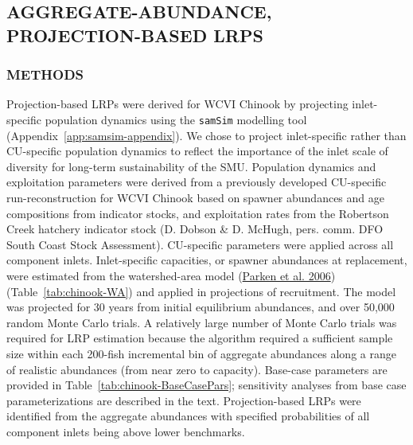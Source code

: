 \documentclass[11pt]{book}
\begin{document}
\hypertarget{aggregate-abundance-projection-based-lrps}{%
\subsection{AGGREGATE-ABUNDANCE, PROJECTION-BASED LRPS}\label{aggregate-abundance-projection-based-lrps}}

\hypertarget{methods-3}{%
\subsubsection{METHODS}\label{methods-3}}

Projection-based LRPs were derived for WCVI Chinook by projecting inlet-specific population dynamics using the \texttt{samSim} modelling tool (Appendix~\ref{app:samsim-appendix}). We chose to project inlet-specific rather than CU-specific population dynamics to reflect the importance of the inlet scale of diversity for long-term sustainability of the SMU. Population dynamics and exploitation parameters were derived from a previously developed CU-specific run-reconstruction for WCVI Chinook based on spawner abundances and age compositions from indicator stocks, and exploitation rates from the Robertson Creek hatchery indicator stock (D. Dobson \& D. McHugh, pers. comm. DFO South Coast Stock Assessment). CU-specific parameters were applied across all component inlets. Inlet-specific capacities, or spawner abundances at replacement, were estimated from the watershed-area model (\protect\hyperlink{ref-parkenHabitatbasedMethodsEstimate2006}{Parken et al. 2006}) (Table~\ref{tab:chinook-WA}) and applied in projections of recruitment. The model was projected for 30 years from initial equilibrium abundances, and over 50,000 random Monte Carlo trials. A relatively large number of Monte Carlo trials was required for LRP estimation because the algorithm required a sufficient sample size within each 200-fish incremental bin of aggregate abundances along a range of realistic abundances (from near zero to capacity). Base-case parameters are provided in Table~\ref{tab:chinook-BaseCasePars}; sensitivity analyses from base case parameterizations are described in the text. Projection-based LRPs were identified from the aggregate abundances with specified probabilities of all component inlets being above lower benchmarks.
\end{document}
